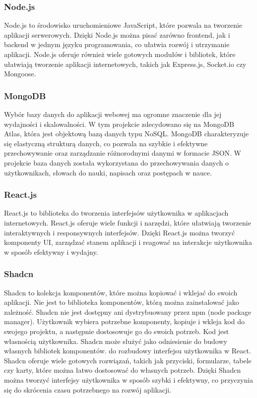 \subsubsection{Node.js}
Node.js to środowisko uruchomieniowe JavaScript, które pozwala na tworzenie aplikacji serwerowych. Dzięki Node.js można pisać zarówno frontend, jak i backend w jednym języku programowania, co ułatwia rozwój i utrzymanie aplikacji. Node.js oferuje również wiele gotowych modułów i bibliotek, które ułatwiają tworzenie aplikacji internetowych, takich jak Express.js, Socket.io czy Mongoose.

\subsubsection{MongoDB}
Wybór bazy danych do aplikacji webowej ma ogromne znaczenie dla jej wydajności i skalowalności. W tym projekcie zdecydowano się na MongoDB Atlas, która jest objektową bazą danych typu NoSQL. MongoDB charakteryzuje się elastyczną strukturą danych, co pozwala na szybkie i efektywne przechowywanie oraz zarządzanie różnorodnymi danymi w formacie JSON. W projekcie baza danych została wykorzystana do przechowywania danych o użytkownikach, słowach do nauki, napisach oraz postępach w nauce.

\subsubsection{React.js}
React.js to biblioteka do tworzenia interfejsów użytkownika w aplikacjach internetowych. React.js oferuje wiele funkcji i narzędzi, które ułatwiają tworzenie interaktywnych i responsywnych interfejsów. Dzięki React.js można tworzyć komponenty UI, zarządzać stanem aplikacji i reagować na interakcje użytkownika w sposób efektywny i wydajny.

\subsubsection{Shadcn}
Shadcn to kolekcja komponentów, które można kopiować i wklejać do swoich aplikacji. Nie jest to biblioteka komponentów, którą można zainstalować jako zależność. Shadcn nie jest dostępny ani dystrybuowany przez npm (node package manager). Użytkownik wybiera potrzebne komponenty, kopiuje i wkleja kod do swojego projektu, a następnie dostosowuje go do swoich potrzeb. Kod jest własnością użytkownika. Shadcn może służyć jako odniesienie do budowy własnych bibliotek komponentów. do rozbudowy interfejsu użytkownika w React. Shadcn oferuje wiele gotowych rozwiązań, takich jak przyciski, formularze, tabele czy karty, które można łatwo dostosować do własnych potrzeb. Dzięki Shadcn można tworzyć interfejsy użytkownika w sposób szybki i efektywny, co przyczynia się do skrócenia czasu potrzebnego na rozwój aplikacji.





